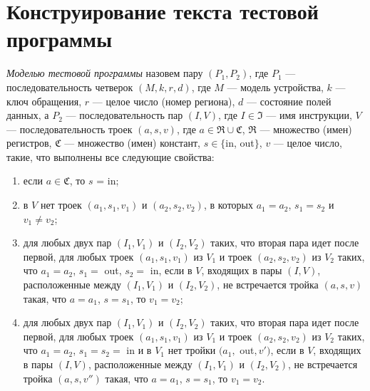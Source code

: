 

\section{Конструирование текста тестовой программы}\label{sec:program_construction}

\emph{Моделью тестовой программы} назовем пару $(P_1, P_2)$, где $P_1$ --- последовательность четверок $(M, k, r, d)$, где $M$ --- модель устройства, $k$ --- ключ обращения, $r$ --- целое число (номер региона), $d$ --- состояние полей данных, а $P_2$ --- последовательность пар $(I, V)$, где $I \in \mathfrak{I}$ --- имя инструкции, $V$ --- последовательность троек $(a, s, v)$, где $a \in \mathfrak{R} \cup \mathfrak{C}$, $\mathfrak{R}$ --- множество (имен) регистров, $\mathfrak{C}$ --- множество (имен) констант, $s \in \{$in, out$\}$, $v$ --- целое число, такие, что выполнены все следующие свойства:
\begin{enumerate}
  \item если $a \in \mathfrak{C}$, то $s$ = in;
  \item в $V$ нет троек $(a_1, s_1, v_1)$ и $(a_2, s_2, v_2)$, в которых $a_1 = a_2$, $s_1 = s_2$ и $v_1 \neq v_2$;
  \item для любых двух пар $(I_1, V_1)$ и $(I_2, V_2)$ таких, что вторая пара идет после первой, для любых троек $(a_1, s_1, v_1)$ из $V_1$ и троек $(a_2, s_2, v_2)$ из $V_2$ таких, что $a_1 = a_2$, $s_1 =$ out, $s_2 =$ in, если в $V$, входящих в пары $(I, V)$, расположенные между $(I_1, V_1)$ и $(I_2, V_2)$, не встречается тройка $(a, s, v)$ такая, что $a = a_1$, $s = s_1$, то $v_1 = v_2$;
  \item для любых двух пар $(I_1, V_1)$ и $(I_2, V_2)$ таких, что вторая пара идет после первой, для любых троек $(a_1, s_1, v_1)$ из $V_1$ и троек $(a_2, s_2, v_2)$ из $V_2$ таких, что $a_1 = a_2$, $s_1 =s_2 =$ in и в $V_1$ нет тройки $(a_1,$ out$, v')$, если в $V$, входящих в пары $(I, V)$, расположенные между $(I_1, V_1)$ и $(I_2, V_2)$, не встречается тройка $(a, s, v'')$ такая, что $a = a_1$, $s = s_1$, то $v_1 = v_2$.
\end{enumerate}

